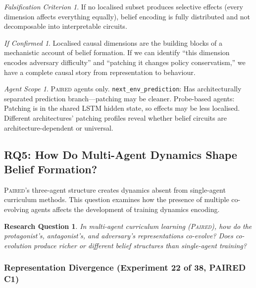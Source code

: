\documentclass[11pt,a4paper]{article}
\newtheorem{researchq}{Research Question}[subsection]
\theoremstyle{remark}
\newtheorem*{falsification}{Falsification Criterion}
\newtheorem*{implication}{If Confirmed}
\newtheorem*{agentscope}{Agent Scope}
\newcommand{\paired}{\textsc{Paired}}
\begin{document}
\begin{falsification}
If no localised subset produces selective effects (every dimension affects everything equally), belief encoding is fully distributed and not decomposable into interpretable circuits.
\end{falsification}

\begin{implication}
Localised causal dimensions are the building blocks of a mechanistic account of belief formation. If we can identify ``this dimension encodes adversary difficulty'' and ``patching it changes policy conservatism,'' we have a complete causal story from representation to behaviour.
\end{implication}

\begin{agentscope}
\paired{} agents only. \texttt{next\_env\_prediction}: Has architecturally separated prediction branch---patching may be cleaner. Probe-based agents: Patching is in the shared LSTM hidden state, so effects may be less localised. Different architectures' patching profiles reveal whether belief circuits are architecture-dependent or universal.
\end{agentscope}

\subsection{RQ5: How Do Multi-Agent Dynamics Shape Belief Formation?}
\label{sec:rq5}

\paired{}'s three-agent structure creates dynamics absent from single-agent curriculum methods. This question examines how the presence of multiple co-evolving agents affects the development of training dynamics encoding.

\begin{researchq}
In multi-agent curriculum learning (\paired{}), how do the protagonist's, antagonist's, and adversary's representations co-evolve? Does co-evolution produce richer or different belief structures than single-agent training?
\end{researchq}

\subsubsection{Representation Divergence (Experiment 22 of 38, PAIRED C1)}
\label{exp:representation_divergence}
\end{document}
